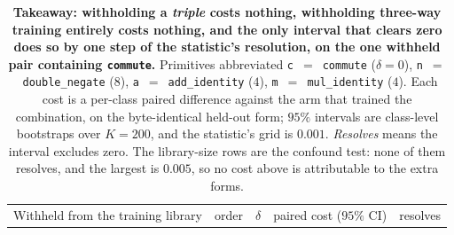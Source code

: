 \begin{table}[t]
\centering
\caption{\textbf{Takeaway: withholding a \emph{triple} costs nothing, withholding three-way training entirely costs nothing, and the only interval that clears zero does so by one step of the statistic's resolution, on the one withheld pair containing \texttt{commute}.} Primitives abbreviated \texttt{c}~$=$~\texttt{commute} ($\delta{=}0$), \texttt{n}~$=$~\texttt{double\_negate} ($8$), \texttt{a}~$=$~\texttt{add\_identity} ($4$), \texttt{m}~$=$~\texttt{mul\_identity} ($4$). Each cost is a per-class paired difference against the arm that trained the combination, on the byte-identical held-out form; $95\%$ intervals are class-level bootstraps over $K{=}200$, and the statistic's grid is $0.001$. \emph{Resolves} means the interval excludes zero. The library-size rows are the confound test: none of them resolves, and the largest is $0.005$, so no cost above is attributable to the extra forms.}
\label{tab:cooccurrence}
\small\setlength{\tabcolsep}{5pt}%
\begin{tabular}{@{}l c c l c@{}}
\toprule
Withheld from the training library & order & $\delta$ & paired cost ($95\%$ CI) & resolves \\

\end{tabular}
\end{table}
